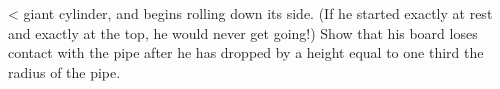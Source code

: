 <%
giant cylinder, and begins rolling down its side. (If he
started exactly at rest and exactly at the top, he would
never get going!) Show that his board loses contact with the
pipe after he has dropped by a height equal to one third
the radius of the pipe.
